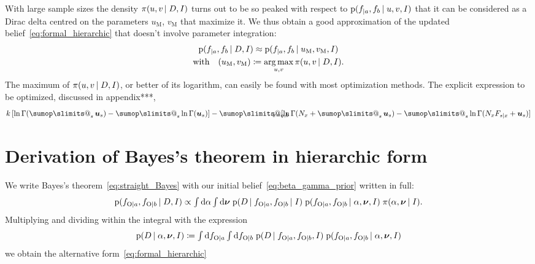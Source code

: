 \documentclass[\ifafour a4paper,12pt,\else a5paper,10pt,\fi%
onecolumn,oneside,article,%
british%
]{memoir}
\makeatletter
\theoremstyle{remark}
\theoremstyle{innote}
\def\sum{\DOTSI\sumop\slimits@}
\newcommand*{\di}{\mathrm{d}}%
\newcommand*{\defd}{\coloneqq}
\newcommand*{\pf}{\mathrm{p}}%
\renewcommand*{\|}[1][]{\nonscript\,#1\vert\nonscript\;\mathopen{}}
\newcommand*{\tsum}{\mathop{\textstyle\sum}\nolimits}
\newcommand*{\tint}{\begingroup\textstyle\int\endgroup\nolimits}
\DeclareMathOperator*{\argmax}{arg\,max}
\newcommand*{\yD}{D}
\newcommand*{\yI}{I}
\newcommand*{\ya}{a}
\newcommand*{\yb}{b}
\newcommand*{\ysO}{\textrm{O}}%
\newcommand*{\dbeta}{\betaup}
\newcommand*{\dA}{\pi}
\newcommand*{\yA}{\alpha}
\newcommand*{\yqq}{\nu}
\newcommand*{\yq}{\bm{\yqq}}
\newcommand*{\yu}{\bm{u}}
\newcommand*{\yua}{u}
\newcommand*{\yub}{v}
\newcommand*{\yuam}{\yua_{\text{M}}}
\newcommand*{\yubm}{\yub_{\text{M}}}
\newcommand*{\yna}{k}
\makeatother
\begin{document}
With large sample sizes the density $\dA(\yua,\yub \|\yD, \yI)$ turns out to
be so peaked with respect to
$\pf(f_{|\ya}, f_{\yb}\| \yua,\yub,\yI)$ that it can be considered
as a Dirac delta centred on the parameters $\yuam$, $\yubm$ that maximize it.
We thus obtain a good approximation of the updated
belief~\eqref{eq:formal_hierarchic} that doesn't involve parameter integration:
\begin{multline}
  \label{eq:formal_hierarchic_approx}
  \pf(f_{|\ya}, f_{\yb} \| \yD, \yI) \approx
  \pf(f_{|\ya}, f_{\yb}\| \yuam,\yubm,\yI)\\
  \text{with}\quad
  (\yuam,\yubm) \defd \argmax_{\yua,\yub}\dA(\yua,\yub \|\yD, \yI).
\end{multline}
The maximum of $\dA(\yua,\yub \|\yD, \yI)$, or better of its logarithm, can
easily be found with most optimization methods. The explicit expression to
be optimized, discussed in appendix***,
\begin{equation}
  \label{eq:to_optimize}
  \yna\,[\ln\Gamma(\tsum_s\yu_s) - \tsum_s\ln\Gamma(\yu_s)]
  -\sum_{\mathclap{x=\ya,\yb}}
  [\ln\Gamma(N_x+\tsum_s\yu_s) - \tsum_s\ln\Gamma(N_xF_{s\|x}+\yu_s)]
\end{equation}


\section{Derivation of Bayes's theorem in hierarchic form}
\label{sec:bayes_hierarcic}

We write Bayes's theorem~\eqref{eq:straight_Bayes} with our initial
belief~\eqref{eq:beta_gamma_prior} written in full:
\begin{equation}
  \label{eq:straight_Bayes_full_prior}
  \pf(f_{\ysO\|\ya}, f_{\ysO\|\yb} \| \yD, \yI)
  \propto
  \tint\di\yA\tint\di\yq\;
    \pf(\yD \| f_{\ysO\|\ya}, f_{\ysO\|\yb} \| \yI)\;
 \pf(f_{\ysO\|\ya}, f_{\ysO\|\yb} \|\yA,\yq, \yI)\;
  \dA(\yA,\yq \|\yI).
\end{equation}
Multiplying and dividing within the integral with the expression
\begin{equation}
  \label{eq:def_Aq_given_data}
    \pf(\yD \|\yA,\yq,\yI)\defd
\tint\di f_{\ysO\|\ya}\tint\di f_{\ysO\|\yb}\;
  \pf(\yD \|f_{\ysO\|\ya}, f_{\ysO\|\yb}, \yI)\;
  \pf(f_{\ysO\|\ya}, f_{\ysO\|\yb}\| \yA,\yq,\yI)
\end{equation}
we obtain the alternative form~\eqref{eq:formal_hierarchic}
\end{document}
